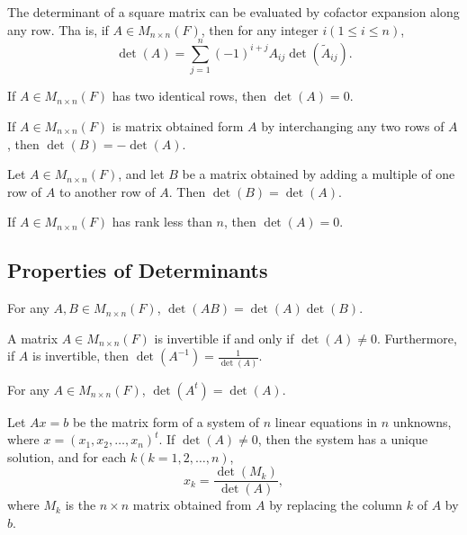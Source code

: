 \newpage
\begin{theorem}
    The determinant of a square matrix can be evaluated by cofactor expansion along any row. Tha is, if \( A \in M_{n \times n}(F) \), then for any integer \( i(1 \leq i \leq n ) \),
    \[
    \det (A) = \sum_{j=1}^{n} (-1)^{i+j} A_{ij} \det (\tilde{A}_{ij}).
    \]
\end{theorem}
\vspace{3cm}
\begin{corollary}
    If \( A \in M_{n \times n}(F) \) has two identical rows, then \(\det (A) = 0\).
\end{corollary}
\vspace{5cm}
\begin{theorem}
    If \( A \in M_{n \times n}(F) \) is matrix obtained form \(A\) by interchanging any two rows of \(A\), then \(\det (B) = - \det (A)\).
\end{theorem}
\newpage
\begin{theorem}
    Let \( A \in M_{n \times n}(F) \), and let \( B \) be a matrix obtained by adding a multiple of one row of \(A\) to another row of \(A\). Then \(\det (B) = \det (A)\).
\end{theorem}
\vspace{3cm}
\begin{corollary}
    If \( A \in M_{n \times n}(F) \) has rank less than \(n\), then \(\det (A) = 0\).
\end{corollary}
\vspace{3cm}
\subsection{Properties of Determinants}
\begin{theorem}
    For any \(A,B \in M_{n \times n}(F)\), \( \det (AB) = \det (A) \det (B) \).
\end{theorem}
\newpage
\begin{corollary}
    A matrix \(A \in M_{n \times n}(F)\) is invertible if and only if \(\det (A) \neq 0\).
    Furthermore, if \(A\) is invertible, then \(\det (A^{-1}) = \frac{1}{\det (A)}\).
\end{corollary}
\vspace{3cm}
\begin{theorem}
    For any \(A \in M_{n \times n}(F)\), \(\det (A^t) = \det (A)\).
\end{theorem}
\vspace{5cm}
\begin{theorem}
    Let \( Ax = b\) be the matrix form of a system of \( n\) linear equations in \( n \) unknowns, where \( x = (x_1, x_2, \dots , x_n)^t \).
    If \(\det (A) \neq 0\), then the system has a unique solution, and for each \(k (k = 1, 2, \dots , n)\),
    \[
    x_k = \frac{\det (M_k)}{\det (A)},
    \]
    where \(M_k\) is the \(n \times n \) matrix obtained from \(A\) by replacing the column \(k\) of \(A\) by \(b\).
\end{theorem}
\vspace{5cm}
